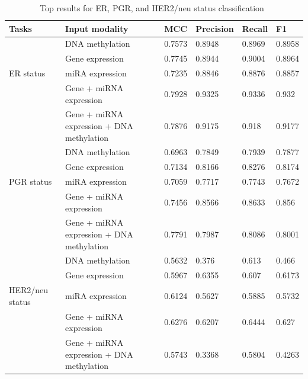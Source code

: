 \begin{table}[h]
    \centering
    \footnotesize
    \caption{Top results for ER, PGR, and HER2/neu status classification~\cite{karimACCESS2019}}
    \vspace{-2mm}
    \label{tab:all_results}
    \begin{tabular}{l|l|l|l|l|l} 
        \hline
        \textbf{Tasks} & \textbf{Input modality} & \textbf{MCC} & \textbf{Precision} & \textbf{Recall} & \textbf{F1} \\ 
        \hline
         & DNA methylation   & 0.7573 & 0.8948    & 0.8969 & 0.8958  \\ 
        \cline{2-6}
            & Gene expression  & 0.7745 & 0.8944    & 0.9004 & 0.8964  \\ 
        \cline{2-6}
        ER status       & miRA expression & 0.7235 & 0.8846    & 0.8876 & 0.8857  \\ 
        \cline{2-6}
                      & Gene + miRNA expression  & 0.7928 & 0.9325    & 0.9336 & 0.932   \\ 
        \cline{2-6}
                   & Gene + miRNA expression + DNA methylation & 0.7876 & 0.9175    & 0.918  & 0.9177  \\ 
        \hline
                     & DNA methylation   & 0.6963 & 0.7849    & 0.7939 & 0.7877  \\ 
        \cline{2-6}
                       & Gene expression  & 0.7134 & 0.8166    & 0.8276 & 0.8174  \\ 
        \cline{2-6}
        PGR status  & miRA expression   & 0.7059 & 0.7717    & 0.7743 & 0.7672  \\ 
        \cline{2-6}
                     & Gene + miRNA expression   & 0.7456 & 0.8566    & 0.8633 & 0.856   \\ 
        \cline{2-6}
                     & Gene + miRNA expression + DNA methylation & 0.7791 & 0.7987    & 0.8086 & 0.8001  \\ 
        \hline
                    & DNA methylation   & 0.5632 & 0.376     & 0.613  & 0.466   \\ 
        \cline{2-6}
                     & Gene expression   & 0.5967 & 0.6355    & 0.607  & 0.6173  \\ 
        \cline{2-6}
        HER2/neu status & miRA expression  & 0.6124 & 0.5627    & 0.5885 & 0.5732  \\ 
        \cline{2-6}
                   & Gene + miRNA expression   & 0.6276 & 0.6207    & 0.6444 & 0.627   \\ 
        \cline{2-6}
                   & Gene + miRNA expression + DNA methylation & 0.5743 & 0.3368    & 0.5804 & 0.4263  \\
        \hline
    \end{tabular}
    \vspace{-2mm}
\end{table}


